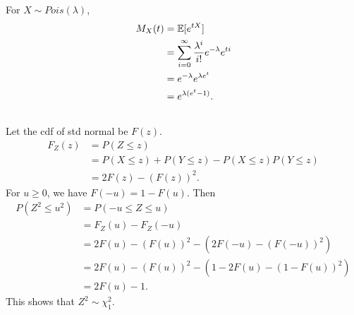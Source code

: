 \subsubsection{} %

For $X\sim Pois(\lambda)$,
\begin{align}
    M_X(t)
        &= \mathbb{E}[e^{tX}] \\
        &= \sum_{i=0}^\infty \frac{\lambda^i}{i!}e^{-\lambda}e^{ti} \\
        &= e^{-\lambda}e^{\lambda e^t} \\
        &= e^{\lambda(e^t-1)}.
\end{align}


\subsection{} %

Let the cdf of std normal be $F(z)$.
\begin{align}
    F_Z(z)
        &= P(Z\le z) \\
        &= P(X\le z) + P(Y\le z) - P(X\le z)P(Y\le z) \\
        &= 2F(z) - (F(z))^2.
\end{align}
For $u\ge0$, we have $F(-u)=1-F(u)$. Then
\begin{align}
    P(Z^2\le u^2)
        &= P(-u\le Z\le u) \\
        &= F_Z(u) - F_Z(-u) \\
        &= 2F(u) - (F(u))^2 - (2F(-u) - (F(-u))^2) \\
        &= 2F(u) - (F(u))^2 - (1 - 2F(u) - (1 - F(u))^2) \\
        &= 2F(u) - 1.
\end{align}
This shows that $Z^2\sim \chi_1^2$.


\subsection{} %

